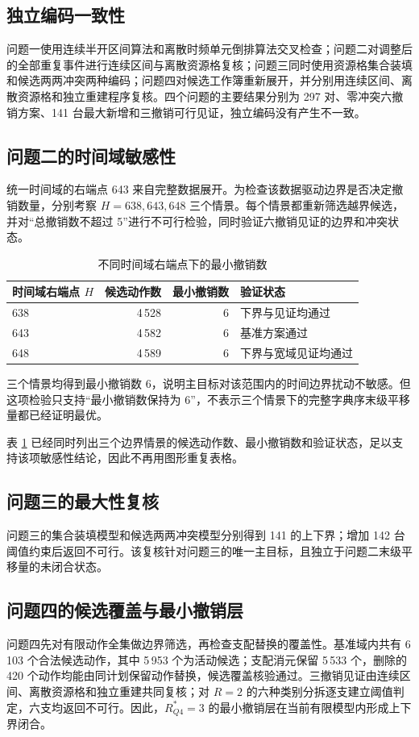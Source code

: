 \subsection{独立编码一致性}
问题一使用连续半开区间算法和离散时频单元倒排算法交叉检查；问题二对调整后的全部重复事件进行连续区间与离散资源格复核；问题三同时使用资源格集合装填和候选两两冲突两种编码；问题四对候选工作簿重新展开，并分别用连续区间、离散资源格和独立重建程序复核。四个问题的主要结果分别为 297 对、零冲突六撤销方案、141 台最大新增和三撤销可行见证，独立编码没有产生不一致。

\subsection{问题二的时间域敏感性}
\label{sec:q2-sensitivity}
统一时间域的右端点 643 来自完整数据展开。为检查该数据驱动边界是否决定撤销数量，分别考察 \(H=638,643,648\) 三个情景。每个情景都重新筛选越界候选，并对“总撤销数不超过 5”进行不可行检验，同时验证六撤销见证的边界和冲突状态。

\begin{table}[H]
\centering
\caption{不同时间域右端点下的最小撤销数}
\label{tab:q2-horizon}
\begin{tabular}{lrrl}
\toprule
时间域右端点 \(H\) & 候选动作数 & 最小撤销数 & 验证状态 \\
\midrule
638 & 4\,528 & 6 & 下界与见证均通过 \\
643 & 4\,582 & 6 & 基准方案通过 \\
648 & 4\,589 & 6 & 下界与宽域见证均通过 \\
\bottomrule
\end{tabular}
\end{table}

三个情景均得到最小撤销数 6，说明主目标对该范围内的时间边界扰动不敏感。但这项检验只支持“最小撤销数保持为 6”，不表示三个情景下的完整字典序末级平移量都已经证明最优。

表 \ref{tab:q2-horizon} 已经同时列出三个边界情景的候选动作数、最小撤销数和验证状态，足以支持该项敏感性结论，因此不再用图形重复表格。

\subsection{问题三的最大性复核}
问题三的集合装填模型和候选两两冲突模型分别得到 141 的上下界；增加 142 台阈值约束后返回不可行。该复核针对问题三的唯一主目标，且独立于问题二末级平移量的未闭合状态。

\subsection{问题四的候选覆盖与最小撤销层}
问题四先对有限动作全集做边界筛选，再检查支配替换的覆盖性。基准域内共有 6\,103 个合法候选动作，其中 5\,953 个为活动候选；支配消元保留 5\,533 个，删除的 420 个动作均能由同计划保留动作替换，候选覆盖核验通过。三撤销见证由连续区间、离散资源格和独立重建共同复核；对 $R=2$ 的六种类别分拆逐支建立阈值判定，六支均返回不可行。因此，$R_{Q4}^{\ast}=3$ 的最小撤销层在当前有限模型内形成上下界闭合。


